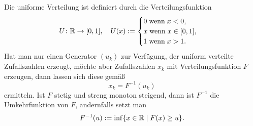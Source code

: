 \minisection{}
Die uniforme Verteilung ist definiert durch die Verteilungsfunktion
\begin{equation}
U\colon\mathbb R\to [0,1],\quad U(x):=\begin{cases}
0\;\text{wenn}\;x<0,\\
x\;\text{wenn}\;x\in [0,1],\\
1\;\text{wenn}\;x>1.
\end{cases}
\end{equation}
Hat man nur einen Generator $(u_k)$ zur Verfügung, der uniform
verteilte Zufallszahlen erzeugt, möchte aber Zufallszahlen $x_k$
mit Verteilungsfunktion $F$ erzeugen, dann lassen sich diese
gemäß
\begin{equation}
x_k = F^{-1}(u_k)
\end{equation}
ermitteln. Ist $F$ stetig und streng monoton steigend, dann
ist $F^{-1}$ die Umkehrfunktion von $F$, andernfalls setzt man
\begin{equation}
F^{-1}(u) := \inf\{x\in\mathbb R\mid F(x)\ge u\}.
\end{equation}


